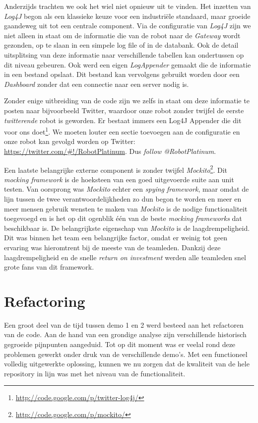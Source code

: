 \documentclass[12pt,a4paper]{report}
\begin{document}
Anderzijds trachten we ook het wiel niet opnieuw uit te vinden. Het inzetten van \emph{Log4J} begon als een klassieke keuze voor een industri\"ele standaard, maar groeide gaandeweg uit tot een centrale component. Via de configuratie van \emph{Log4J} zijn we niet alleen in staat om de informatie die van de robot naar de \emph{Gateway} wordt gezonden, op te slaan in een simpele log file of in de databank. Ook de detail uitsplitsing van deze informatie naar verschillende tabellen kan ondertussen op dit niveau gebeuren. Ook werd een eigen \emph{LogAppender} gemaakt die de informatie in een bestand opslaat. Dit bestand kan vervolgens gebruikt worden door een \emph{Dashboard} zonder dat een connectie naar een server nodig is.

Zonder enige uitbreiding van de code zijn we zelfs in staat om deze informatie te posten naar bijvoorbeeld Twitter, waardoor onze robot zonder twijfel de eerste \emph{twitterende} robot is geworden. Er bestaat immers een Log4J Appender die dit voor ons doet\footnote{\url{http://code.google.com/p/twitter-log4j/}}. We moeten louter een sectie toevoegen aan de configuratie en onze robot kan gevolgd worden op Twitter: \url{https://twitter.com/\#!/RobotPlatinum}. Dus \emph{follow @RobotPlatinum}.

Een laatste belangrijke externe component is zonder twijfel \emph{Mockito}\footnote{\url{http://code.google.com/p/mockito/}}. Dit \emph{mocking framework} is de hoeksteen van een goed uitgevoerde suite aan unit testen. Van oorsprong was \emph{Mockito} echter een \emph{spying framework}, maar omdat de lijn tussen de twee verantwoordelijkheden zo dun begon te worden en meer en meer mensen gebruik wensten te maken van \emph{Mockito} is de nodige functionaliteit toegevoegd en is het op dit ogenblik \'e\'en van de beste \emph{mocking frameworks} dat beschikbaar is. De belangrijkste eigenschap van \emph{Mockito} is de laagdrempeligheid. Dit was binnen het team een belangrijke factor, omdat er weinig tot geen ervaring was hieromtrent bij de meeste van de teamleden. Dankzij deze laagdrempeligheid en de snelle \emph{return on investment} werden alle teamleden snel grote fans van dit framework.

\section{Refactoring}

Een groot deel van de tijd tussen demo 1 en 2 werd besteed aan het refactoren van de code. Aan de hand van een grondige analyse zijn verschillende historisch gegroeide pijnpunten aangeduid. Tot op dit moment was er veelal rond deze problemen gewerkt onder druk van de verschillende demo's. Met een functioneel volledig uitgewerkte oplossing, kunnen we nu zorgen dat de kwaliteit van de hele repository in lijn was met het niveau van de functionaliteit.
\end{document}
